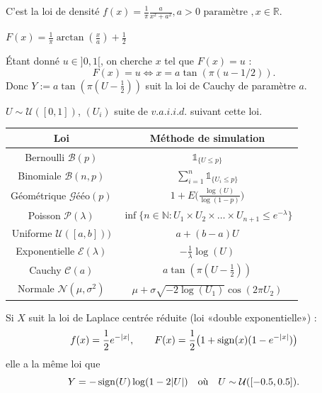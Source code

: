 {
C’est la loi de densité $f(x)=\frac{1}{\pi}\frac{a}{x^2+a^2}, a>0 \text{ paramètre }, x\in\mathbb{R}$.\\
\vspace{0.05cm}

$F(x)=\frac{1}{\pi} \arctan(\frac{x}{a})+\frac{1}{2}$\\
\vspace{0.05cm}

Étant donné $u \in ]0,1[$, on cherche $x$ tel que $F(x) = u$ : $$F(x)=u\iff x=a\tan(\pi(u-1/2)).$$
Donc $Y:=a\tan(\pi(U-\frac{1}{2}))$ suit la loi de Cauchy de paramètre $a$.


$U\sim\mathcal{U}([0,1])$, $(U_i)$ suite de $v.a.i.i.d.$ suivant cette loi.

\begin{table}[h!]
\centering
\begin{tabular}{||c | c||}
\hline
Loi                             &   Méthode de simulation\\
\hline
Bernoulli $\mathcal{B}(p)$              &   $\mathds{1}_{\{U\leq p\}}$\\
\hline
Binomiale $\mathcal{B}(n,p)$            &   $\sum_{i=1}^{n}\mathds{1}_{\{U_i\leq p\}}$\\
\hline
Géométrique $\mathcal{Gé}\text{éo}(p)$  &   $1+E\big(\frac{\log(U)}{\log(1-p)}\big)$\\
\hline
Poisson $\mathcal{P}(\lambda)$          &   $\inf\{n\in\mathbb{N}:U_1\times U_2\times\dots\times U_{n+1}\leq e^{-\lambda}\}$\\
\hline
Uniforme $\mathcal{U}([a,b]))$          &   $a+(b-a)U$\\
\hline
Exponentielle $\mathcal{E}(\lambda)$    &   $-\frac{1}{\lambda}\log(U)$\\
\hline
Cauchy $\mathcal{C}(a)$                 &   $a\tan(\pi(U-\frac{1}{2}))$\\
\hline
Normale $\mathcal{N}(\mu,\sigma^2)$     &   $\mu+\sigma\sqrt{-2\log(U_1)}\cos(2\pi U_2)$\\
\hline
\end{tabular}

\end{table}

\textbullet Si $X$ suit la loi de Laplace centrée réduite (loi «double
exponentielle») :$$f(x)=\frac{1}{2}e^{-|x|},\quad\mathrm{     }\quad F(x)=\frac{1}{2}\big(1+\operatorname{sign}(x)(1-e^{-|x|})\big)$$
elle a la même loi que $$Y=-\operatorname{sign}(U)\log(1-2|U|)\quad\mathrm{   \text{où}  }\quad U\sim\mathcal{U}([-0.5,0.5]).$$

}

